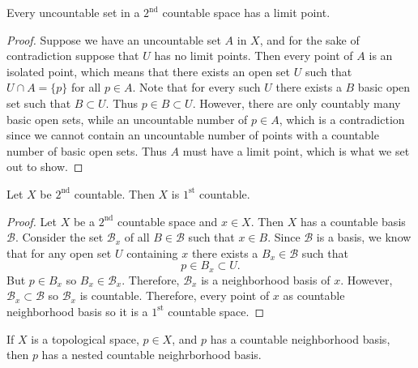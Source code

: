 \documentclass[a4paper,12pt,twoside]{hmcpset}
\begin{document}
\begin{problem}[Theorem 6.11]
    Every uncountable set in a $2^{\text{nd}}$ countable space has a limit point. 
\end{problem}

\begin{proof}
    Suppose we have an uncountable set $A$ in $X$, and for the sake of
    contradiction suppose that $U$ has no limit points. Then every point
    of $A$ is an isolated point, which means that there exists an open set 
    $U$ such that $U \cap A = \{p\}$ for all $p \in A$. Note that
    for every such $U$ there exists a $B$ basic open set such that $B \subset U$.
    Thus $p \in B \subset U$. 
    However, there are only countably many basic open sets, while an uncountable 
    number of $p \in A$, which is a contradiction since we cannot contain an uncountable 
    number of points with a countable number of basic open sets. Thus $A$ 
    must have a limit point, which is what we set out to show. 
\end{proof}

\begin{problem}[Theorem 6.14]
    Let $X$ be $2^\text{nd}$ countable. Then $X$ is $1^\text{st}$
    countable. 
\end{problem}

\begin{proof}
    Let $X$ be a $2^{\textrm{nd}}$ countable space and $x \in X$. 
    Then $X$ has a
    countable basis $\mathscr{B}$. 
    Consider the set $\mathscr{B}_x$ of all 
    $B \in \mathscr{B}$ such that $x \in B$. 
    Since $\mathscr{B}$ is a basis, we know that for any open set $U$
    containing $x$ there exists a $B_x \in \mathscr{B}$ such that 
    \[
        p \in B_x \subset U.
    \]  
    But $p \in B_x$ so $B_x \in \mathscr{B}_x$. Therefore, $\mathscr{B}_x$ is a
    neighborhood basis of $x$. However, $\mathscr{B}_x \subset
    \mathscr{B}$ so $\mathscr{B}_x$ is countable.
    Therefore, every point of $x$ as countable neighborhood basis
    so it is a $1^{\textrm{st}}$ countable space. 
\end{proof}

\begin{problem}[Theorem 6.15]
    If $X$ is a topological space, $p \in X$, and $p$ has a countable
    neighborhood basis, then $p$ has a nested countable neighrborhood
    basis.
\end{problem}
\end{document}
